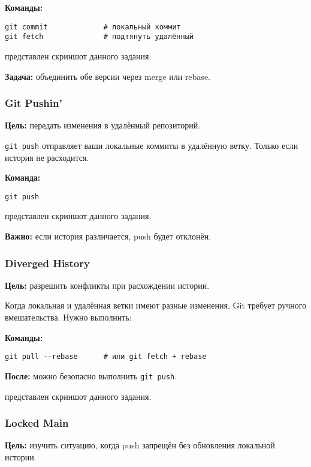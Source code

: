 \documentclass[a4paper,12pt]{report}
\begin{document}
\textbf{Команды:}
\begin{verbatim}
git commit             # локальный коммит
git fetch              # подтянуть удалённый
\end{verbatim}

 представлен скриншот данного задания.

\textbf{Задача:} объединить обе версии через merge или rebase.

\subsubsection{Git Pushin'}
\textbf{Цель:} передать изменения в удалённый репозиторий.

\texttt{git push} отправляет ваши локальные коммиты в удалённую ветку. Только если история не расходится.

\textbf{Команда:}
\begin{verbatim}
git push
\end{verbatim}

 представлен скриншот данного задания.

\textbf{Важно:} если история различается, push будет отклонён.

\subsubsection{Diverged History}
\textbf{Цель:} разрешить конфликты при расхождении истории.

Когда локальная и удалённая ветки имеют разные изменения, Git требует ручного вмешательства. Нужно выполнить:

\textbf{Команды:}
\begin{verbatim}
git pull --rebase      # или git fetch + rebase
\end{verbatim}

\textbf{После:} можно безопасно выполнить \texttt{git push}.

 представлен скриншот данного задания.

\subsubsection{Locked Main}
\textbf{Цель:} изучить ситуацию, когда push запрещён без обновления локальной истории.
\end{document}

